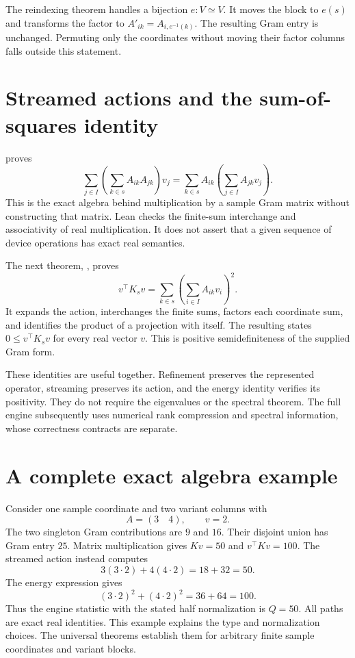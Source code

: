 The reindexing theorem  handles a bijection
$e:V\simeq V$. It moves the block to $e(s)$ and transforms the factor to
$A'_{ik}=A_{i,e^{-1}(k)}$. The resulting Gram entry is unchanged. Permuting
only the coordinates without moving their factor columns falls outside this
statement.

\section{Streamed actions and the sum-of-squares identity}

 proves
\[
 \sum_{j\in I}\left(\sum_{k\in s}A_{ik}A_{jk}\right)v_j
 =\sum_{k\in s}A_{ik}\left(\sum_{j\in I}A_{jk}v_j\right).
\]
This is the exact algebra behind multiplication by a sample Gram matrix
without constructing that matrix. Lean checks the finite-sum interchange and
associativity of real multiplication. It does not assert that a given
sequence of device operations has exact real semantics.

The next theorem, , proves
\[
 v^\top K_s v=\sum_{k\in s}\left(\sum_{i\in I}A_{ik}v_i\right)^2.
\]
It expands the action, interchanges the finite sums, factors each coordinate
sum, and identifies the product of a projection with itself. The resulting
 states $0\le v^\top K_s v$ for every real
vector $v$. This is positive semidefiniteness of the supplied Gram form.

These identities are useful together. Refinement preserves the represented
operator, streaming preserves its action, and the energy identity verifies
its positivity. They do not require the eigenvalues or the spectral theorem.
The full engine subsequently uses numerical rank compression and spectral
information, whose correctness contracts are separate.

\section{A complete exact algebra example}

Consider one sample coordinate and two variant columns with
\[
 A=(3\quad4),\qquad v=2.
\]
The two singleton Gram contributions are $9$ and $16$. Their disjoint union
has Gram entry $25$. Matrix multiplication gives $Kv=50$ and
$v^\top Kv=100$. The streamed action instead computes
\[
 3(3\cdot2)+4(4\cdot2)=18+32=50.
\]
The energy expression gives
\[
 (3\cdot2)^2+(4\cdot2)^2=36+64=100.
\]
Thus the engine statistic with the stated half normalization is $Q=50$.
All paths are exact real identities. This example explains the type and
normalization choices. The universal theorems establish them for arbitrary
finite sample coordinates and variant blocks.

